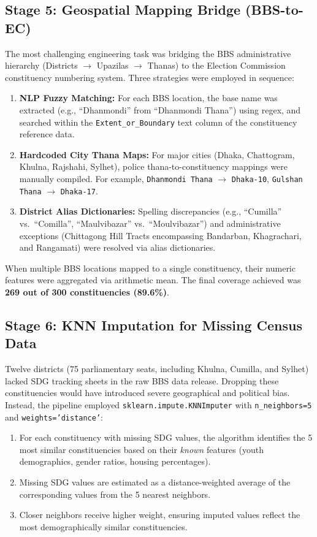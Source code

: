 \documentclass[12pt, a4paper]{article}
\begin{document}
\subsection{Stage 5: Geospatial Mapping Bridge (BBS-to-EC)}
The most challenging engineering task was bridging the BBS administrative hierarchy (Districts $\rightarrow$ Upazilas $\rightarrow$ Thanas) to the Election Commission constituency numbering system. Three strategies were employed in sequence:

\begin{enumerate}
    \item \textbf{NLP Fuzzy Matching:} For each BBS location, the base name was extracted (e.g., ``Dhanmondi'' from ``Dhanmondi Thana'') using regex, and searched within the \texttt{Extent\_or\_Boundary} text column of the constituency reference data.
    \item \textbf{Hardcoded City Thana Maps:} For major cities (Dhaka, Chattogram, Khulna, Rajshahi, Sylhet), police thana-to-constituency mappings were manually compiled. For example, \texttt{Dhanmondi Thana} $\rightarrow$ \texttt{Dhaka-10}, \texttt{Gulshan Thana} $\rightarrow$ \texttt{Dhaka-17}.
    \item \textbf{District Alias Dictionaries:} Spelling discrepancies (e.g., ``Cumilla'' vs.\ ``Comilla'', ``Maulvibazar'' vs.\ ``Moulvibazar'') and administrative exceptions (Chittagong Hill Tracts encompassing Bandarban, Khagrachari, and Rangamati) were resolved via alias dictionaries.
\end{enumerate}

When multiple BBS locations mapped to a single constituency, their numeric features were aggregated via arithmetic mean. The final coverage achieved was \textbf{269 out of 300 constituencies (89.6\%)}.

\subsection{Stage 6: KNN Imputation for Missing Census Data}
Twelve districts (75 parliamentary seats, including Khulna, Cumilla, and Sylhet) lacked SDG tracking sheets in the raw BBS data release. Dropping these constituencies would have introduced severe geographical and political bias. Instead, the pipeline employed \texttt{sklearn.impute.KNNImputer} with \texttt{n\_neighbors=5} and \texttt{weights='distance'}:

\begin{enumerate}
    \item For each constituency with missing SDG values, the algorithm identifies the 5 most similar constituencies based on their \emph{known} features (youth demographics, gender ratios, housing percentages).
    \item Missing SDG values are estimated as a distance-weighted average of the corresponding values from the 5 nearest neighbors.
    \item Closer neighbors receive higher weight, ensuring imputed values reflect the most demographically similar constituencies.
\end{enumerate}
\end{document}
